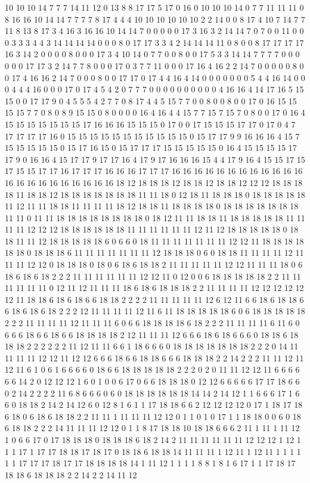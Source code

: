 10 10 10 14 7 7 7 14 11 12 0 13 8 8 17 17 5 17 0 16 0 10 10 10 14 0 7 7 11 11 11 0 8 16 16 10 14 14 7 7 7 7 8 17 4 4 4 10 10 10 10 10 10 2 2 14 0 0 8 17 4 10 7 14 7 7 11 8 13 8 17 3 4 16 3 16 16 10 14 14 7 0 0 0 0 0 17 3 16 3 2 14 14 7 0 7 0 0 11 0 0 0 3 3 3 4 4 3 14 14 14 14 0 0 0 8 0 17 17 3 3 4 2 14 14 14 11 0 8 0 0 8 17 17 17 17 16 3 14 2 0 0 0 0 8 0 0 0 17 3 4 10 14 0 7 7 0 0 8 0 0 17 5 3 3 14 14 7 7 7 7 0 0 0 0 0 0 17 17 3 2 14 7 7 8 0 0 0 17 0 3 7 7 11 0 0 0 17 16 4 16 2 2 14 7 0 0 0 0 0 8 0 0 17 4 16 16 2 14 7 0 0 0 8 0 0 17 17 0 17 4 4 16 4 14 0 0 0 0 0 0 0 5 4 4 16 14 0 0 0 4 4 4 16 0 0 0 17 0 17 4 5 4 2 0 7 7 7 0 0 0 0 0 0 0 0 0 0 4 16 16 4 14 17 16 5 15 15 0 0 17 17 9 0 4 5 5 5 4 2 7 7 0 8 17 4 4 5 15 7 7 0 0 8 0 0 8 0 0 17 0 16 15 15 15 15 7 7 0 8 0 8 9 15 15 0 8 0 0 0 0 16 4 16 4 4 15 7 7 15 7 15 7 0 8 0 0 17 0 16 4 15 15 15 15 15 15 15 17 16 16 16 15 15 15 0 17 0 0 17 15 15 15 17 17 0 17 0 4 7 17 17 17 17 16 0 15 15 15 15 15 15 15 15 15 15 15 0 15 17 17 9 9 16 16 16 4 15 7 15 15 15 15 15 0 15 17 16 15 0 15 17 17 17 15 15 15 15 15 0 16 4 15 15 15 15 17 17 9 0 16 16 4 15 17 17 9 17 17 16 4 17 9 17 16 16 16 15 4 4 17 9 16 4 15 15 17 15 17 15 15 17 17 16 17 17 17 16 16 16 17 17 17 16 16 16 16 16 16 16 16 16 16 16 16 16 16 16 16 16 16 16 16 16 16 18 12 18 18 18 12 18 18 12 18 18 12 12 12 18 18 18 18 11 18 18 12 18 18 18 18 18 18 18 11 11 18 0 12 18 11 18 18 18 0 18 18 18 18 18 11 12 11 11 18 18 11 11 11 11 18 12 18 18 11 18 18 18 18 0 18 18 18 18 18 18 18 11 11 0 11 11 18 18 18 18 18 18 18 18 0 18 12 11 11 18 18 11 18 18 18 18 18 11 11 11 11 12 12 12 18 18 18 18 18 18 11 11 11 11 11 11 12 11 12 18 18 18 18 18 0 18 18 11 11 12 18 18 18 18 18 6 0 6 6 0 18 11 11 11 11 11 11 11 12 12 11 18 18 18 18 18 18 0 18 18 18 6 11 11 11 11 11 11 11 12 18 18 18 0 6 0 18 18 11 11 11 11 12 11 11 11 12 12 0 18 18 18 0 18 0 6 18 6 18 18 2 11 11 11 11 11 12 12 11 11 11 18 0 6 18 6 18 6 18 2 2 2 11 11 11 11 11 11 12 12 11 0 12 0 0 6 18 18 18 18 18 2 2 11 11 11 11 11 11 0 12 11 12 11 11 11 18 6 18 6 18 18 18 2 2 11 11 11 11 12 12 12 12 12 12 11 18 18 6 18 6 18 6 6 18 18 2 2 2 2 11 11 11 11 11 12 6 12 11 6 6 18 6 18 18 6 6 18 6 18 6 18 2 2 2 12 11 11 11 11 12 11 6 11 18 18 18 18 18 6 0 6 18 18 18 18 18 2 2 2 11 11 11 11 12 11 11 11 6 0 6 6 18 18 18 18 6 18 2 2 2 11 11 11 11 6 11 6 0 6 6 6 18 6 6 18 6 6 18 18 18 18 2 12 11 11 11 12 6 6 6 18 6 18 6 6 6 0 18 18 6 18 18 18 2 2 2 2 2 2 11 12 11 11 6 6 1 18 6 6 6 0 18 18 18 18 18 18 18 2 2 2 0 14 11 11 11 11 12 12 11 12 12 6 6 6 18 6 6 18 18 6 6 6 18 18 18 2 2 14 2 2 2 11 11 12 11 12 11 6 1 0 6 1 6 6 6 6 0 18 6 6 18 18 18 18 18 2 2 2 0 2 0 11 11 12 12 11 6 6 6 6 6 6 14 2 0 12 12 12 1 6 0 1 0 0 6 17 0 6 6 18 18 18 0 12 12 6 6 6 6 6 17 17 18 6 6 0 2 14 2 2 2 2 11 6 8 6 6 6 0 6 0 18 18 18 18 18 18 14 14 2 14 12 1 1 6 6 6 17 1 6 6 0 18 18 2 14 2 14 12 6 0 12 8 1 6 1 1 17 18 18 6 6 2 12 12 12 12 0 17 1 18 17 18 6 18 0 6 18 6 18 18 2 2 11 11 1 11 11 11 12 12 0 1 1 0 1 0 17 1 1 18 18 0 0 6 0 18 6 18 18 2 2 2 14 11 11 11 12 12 0 1 1 8 17 18 18 10 18 18 6 6 6 2 11 1 11 1 11 12 1 0 6 6 17 0 17 18 18 18 0 18 18 18 6 18 2 14 2 11 11 11 11 11 11 12 12 12 1 12 1 1 1 17 1 17 17 18 18 17 18 17 0 18 18 6 18 18 14 11 11 11 1 12 11 1 12 11 1 1 1 1 1 1 17 17 17 18 17 17 18 18 18 18 14 1 11 12 1 1 1 1 8 8 1 8 1 6 17 1 1 17 18 17 18 18 6 18 18 18 2 2 14 2 2 14 11 12 